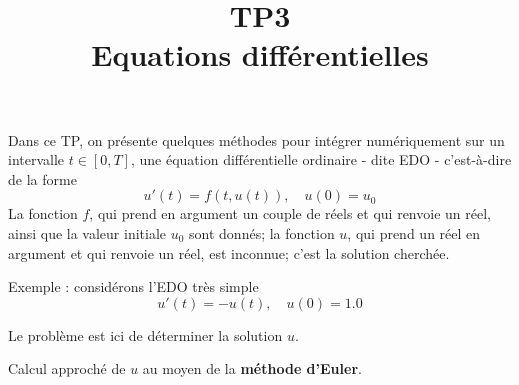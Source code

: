 \documentclass{exam}
\title{TP3\\ Equations différentielles}
\begin{document}
\maketitle


Dans ce TP, on présente quelques méthodes pour intégrer numériquement sur un intervalle $t \in [0, T]$, une équation différentielle ordinaire - dite EDO - c'est-à-dire de la forme
$$u'(t) =  f(t, u(t)),\quad u(0) = u_0$$
La fonction $f$, qui prend en argument un couple de réels et qui renvoie un réel, ainsi que la valeur initiale $u_0$ sont donnés; la fonction $u$, qui prend un réel en argument et qui renvoie un réel, est inconnue; c'est la solution cherchée.

\begin{questions}

\question
Exemple : considérons l'EDO très simple
$$u'(t) =  -u(t), \quad u(0)  =  1.0$$

Le problème est ici de déterminer la solution $u$.

\question
Calcul approché de $u$ au moyen de la {\bf méthode d'Euler}.


\end{questions}
\end{document}
